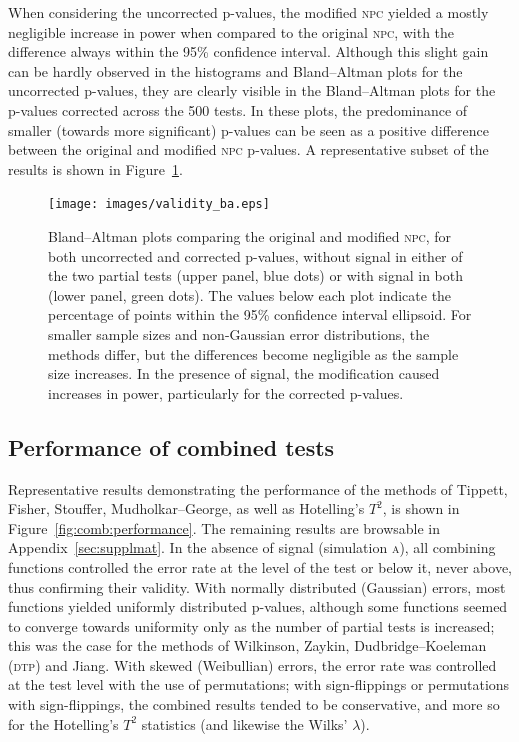 When considering the uncorrected p-values, the modified \textsc{npc} yielded a mostly negligible increase in power when compared to the original \textsc{npc}, with the difference always within the 95\% confidence interval. Although this slight gain can be hardly observed in the histograms and Bland--Altman plots for the uncorrected p-values, they are clearly visible in the Bland--Altman plots for the p-values corrected across the 500 tests. In these plots, the predominance of smaller (towards more significant) p-values can be seen as a positive difference between the original and modified \textsc{npc} p-values. A representative subset of the results is shown in Figure~\ref{fig:comb:validity_ba}.

\begin{figure}[p]
\begin{center}
\centerline{\texttt{[image: images/validity\_ba.eps]}}
\end{center}
\vspace{-3mm}
\caption[Bland--Altman plots comparing original and modified \textsc{npc}.]{Bland--Altman plots comparing the original and modified \textsc{npc}, for both uncorrected and corrected p-values, without signal in either of the two partial tests (upper panel, blue dots) or with signal in both (lower panel, green dots). The values below each plot indicate the percentage of points within the 95\% confidence interval ellipsoid. For smaller sample sizes and non-Gaussian error distributions, the methods differ, but the differences become negligible as the sample size increases. In the presence of signal, the modification caused increases in power, particularly for the corrected p-values.}
\label{fig:comb:validity_ba}
\end{figure}

\subsection{Performance of combined tests}

Representative results demonstrating the performance of the methods of Tippett, Fisher, Stouffer, Mudholkar--George, as well as Hotelling's $T^2$, is shown in Figure~\ref{fig:comb:performance}. The remaining results are browsable in Appendix~\ref{sec:supplmat}. In the absence of signal (simulation \textsc{a}), all combining functions controlled the error rate at the level of the test or below it, never above, thus confirming their validity. With normally distributed (Gaussian) errors, most functions yielded uniformly distributed p-values, although some functions seemed to converge towards uniformity only as the number of partial tests is increased; this was the case for the methods of Wilkinson, Zaykin, Dudbridge--Koeleman (\textsc{dtp}) and Jiang. With skewed (Weibullian) errors, the error rate was controlled at the test level with the use of permutations; with sign-flippings or permutations with sign-flippings, the combined results tended to be conservative, and more so for the Hotelling's $T^2$ statistics (and likewise the Wilks' $\lambda$).

